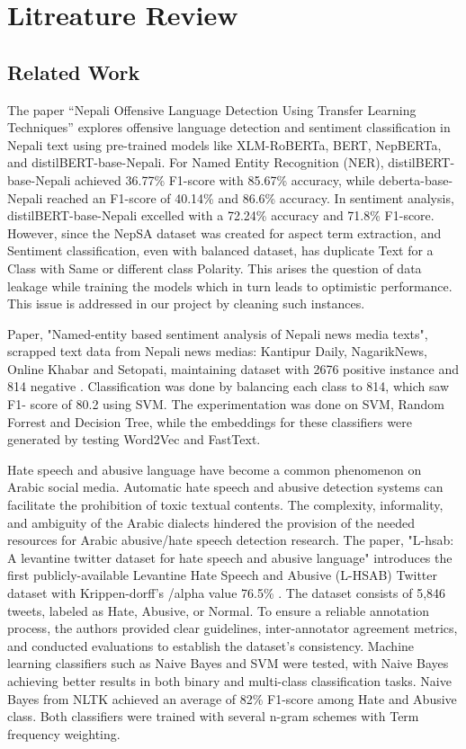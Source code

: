 \chapter{Litreature Review}

\section{Related Work}
The paper “Nepali Offensive Language Detection Using Transfer Learning Techniques” \cite{suwal2023nepali} explores offensive language detection and sentiment classification in Nepali text using pre-trained models like XLM-RoBERTa, BERT, NepBERTa, and distilBERT-base-Nepali. For Named Entity Recognition (NER), distilBERT-base-Nepali achieved 36.77\% F1-score with 85.67\% accuracy, while deberta-base-Nepali reached an F1-score of 40.14\% and 86.6\% accuracy. In sentiment analysis, distilBERT-base-Nepali excelled with a 72.24\% accuracy and 71.8\% F1-score. However, since the NepSA dataset was created for aspect term extraction, and Sentiment classification, even with balanced dataset, has duplicate Text for a Class with Same or different class Polarity. This arises the question of data leakage while training the models which in turn leads to optimistic performance. This issue is addressed in our project by cleaning such instances.

Paper, "Named-entity based sentiment analysis of Nepali news media texts", scrapped text data from Nepali news medias: Kantipur Daily, NagarikNews, Online Khabar and Setopati, maintaining dataset with 2676 positive instance and  814 negative \cite{shrestha2020named}. Classification was done by balancing each class to 814, which saw F1- score of 80.2 using SVM. The experimentation was done on SVM, Random Forrest and Decision Tree, while the embeddings for these classifiers were generated by testing Word2Vec and FastText.

Hate speech and abusive language have become a common phenomenon on Arabic social media. Automatic hate speech and abusive detection systems can facilitate the prohibition of toxic textual contents. The complexity, informality, and ambiguity of the Arabic dialects hindered the provision of the needed resources for Arabic abusive/hate speech detection research. The paper, "L-hsab: A levantine twitter dataset for hate speech and abusive language" introduces the first publicly-available Levantine Hate Speech and Abusive (L-HSAB) Twitter dataset with Krippen-dorff’s /alpha value 76.5\% \cite{mulki2019hsab}. The dataset consists of 5,846 tweets, labeled as Hate, Abusive, or Normal. To ensure a reliable annotation process, the authors provided clear guidelines, inter-annotator agreement metrics, and conducted evaluations to establish the dataset's consistency. Machine learning classifiers such as Naive Bayes and SVM were tested, with Naive Bayes achieving better results in both binary and multi-class classification tasks. Naive Bayes from NLTK achieved an average of 82\% F1-score among Hate and Abusive class. Both classifiers were trained with several n-gram schemes with Term frequency weighting. 

